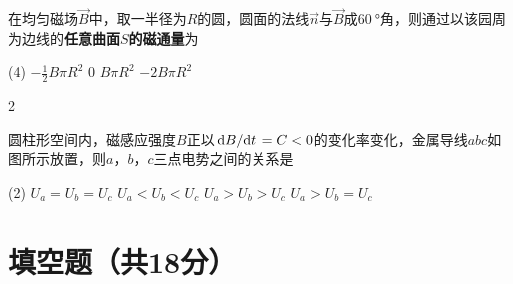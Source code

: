\documentclass[quiet, fontset = fandol, AutoFakeSlant, 10pt]{ctexart}
\let \emph \textbf
\begin{document}
\begin{problem}
    在均匀磁场$\vec B$中，取一半径为$R$的圆，圆面的法线$\vec n$与$\vec B$成$\qty{60}\degree$角，则通过以该园周为边线的\emph{任意曲面$S$的磁通量}为
    \begin{tasks}(4)
        \task[\true] $-\frac12B\pi R^2$
        \task $0$
        \task $B\pi R^2$
        \task $-2B\pi R^2$
    \end{tasks}
\end{problem}
\begin{solution}
    
\end{solution}

\begin{paracol}{2}
\begin{problem}
    圆柱形空间内，磁感应强度$B$正以$\odv B/t=C<0$的变化率变化，金属导线$abc$如图所示放置，则$a$，$b$，$c$三点电势之间的关系是
    \begin{tasks}(2)
        \task $U_a=U_b=U_c$
        \task $U_a<U_b<U_c$
        \task[\true] $U_a>U_b>U_c$
        \task $U_a>U_b=U_c$
    \end{tasks}
    \switchcolumn\vspace*{\fill}
    \centering
    \vspace*{\fill}
\end{problem}
\end{paracol}
\begin{solution}
    
\end{solution}

\section{填空题（共18分）}
\end{document}
